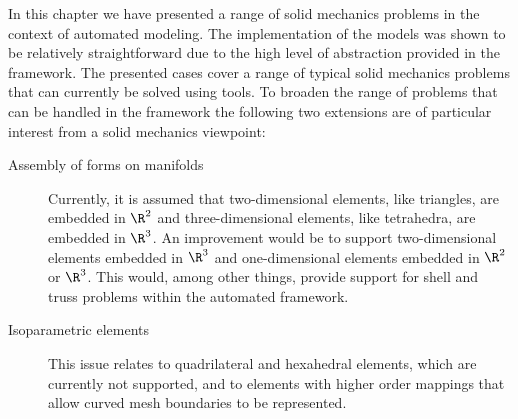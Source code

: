 In this chapter we have presented a range of solid mechanics problems in
the context of automated modeling.  The implementation of the models
was shown to be relatively straightforward due to the high level of
abstraction provided in the \fenics framework.  The presented cases
cover a range of typical solid mechanics problems that can currently be
solved using \fenics tools.  To broaden the range of problems that can
be handled in the \fenics framework the following two extensions are of
particular interest from a solid mechanics viewpoint:
\begin{description}
\item [Assembly of forms on manifolds] Currently, it is assumed that
two-dimensional elements, like triangles, are embedded in $\R^2$ and
three-dimensional elements, like tetrahedra, are embedded in $\R^3$.
An improvement would be to support two-dimensional elements embedded
in $\R^3$ and one-dimensional elements embedded in $\R^2$ or $\R^3$.
This would, among other things, provide support for shell and truss
problems within the automated framework.

\item [Isoparametric elements] This issue relates to quadrilateral
and hexahedral elements, which are currently not supported, and to
elements with higher order mappings that allow curved mesh boundaries
to be represented.
\end{description}
